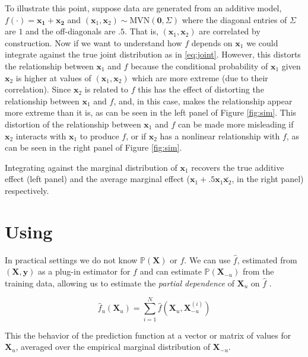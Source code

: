 To illustrate this point, suppose data are generated from an additive model, $f(\cdot) = \mathbf{\mathbf{x}_1} + \mathbf{\mathbf{x}_2}$ and $(\mathbf{x}_1, \mathbf{x}_2) \sim \text{MVN}(\mathbf{0}, \Sigma)$ where the diagonal entries of $\Sigma$ are $1$ and the off-diagonals are $.5$. That is, $(\mathbf{x}_1, \mathbf{x}_2)$ are correlated by construction. Now if we want to understand how $f$ depends on $\mathbf{x}_1$ we could integrate against the true joint distribution as in \ref{eq:joint}. However, this distorts the relationship between $\mathbf{x}_1$ and $f$ because the conditional probability of $\mathbf{x}_1$ given $\mathbf{x}_2$ is higher at values of $(\mathbf{x}_1, \mathbf{x}_2)$ which are more extreme (due to their correlation). Since $\mathbf{x}_2$ is related to $f$ this has the effect of distorting the relationship between $\mathbf{x}_1$ and $f$, and, in this case, makes the relationship appear more extreme than it is, as can be seen in the left panel of Figure \ref{fig:sim}. This distortion of the relationship between $\mathbf{x}_1$ and $f$ can be made more misleading if $\mathbf{x}_2$ interacts with $\mathbf{x}_1$ to produce $f$, or if $\mathbf{x}_2$ has a nonlinear relationship with $f$, as can be seen in the right panel of Figure \ref{fig:sim}.

Integrating against the marginal distribution of $\mathbf{x}_1$ recovers the true additive effect (left panel) and the average marginal effect ($\mathbf{x}_1 + .5 \mathbf{x}_1 \bar{\mathbf{x}_2}$, in the right panel) respectively.

\section{Using }

In practical settings we do not know $\mathbb{P}(\mathbf{X})$ or $f$. We can use $\hat{f}$, estimated from $(\mathbf{X}, \mathbf{y})$ as a plug-in estimator for $f$ and can estimate $\mathbb{P}(\mathbf{X}_{-u})$ from the training data, allowing us to estimate the \emph{partial dependence} of $\mathbf{X}_u$ on $\hat{f}$ \cite{friedman2001greedy}.

$$\hat{f}_u (\mathbf{X}_u) = \sum_{i = 1}^N \hat{f} (\mathbf{X}_u, \mathbf{X}_{-u}^{(i)}) \label{eq:pd}$$

This the behavior of the prediction function at a vector or matrix of values for $\mathbf{X}_u$, averaged over the empirical marginal distribution of $\mathbf{X}_{-u}$.

